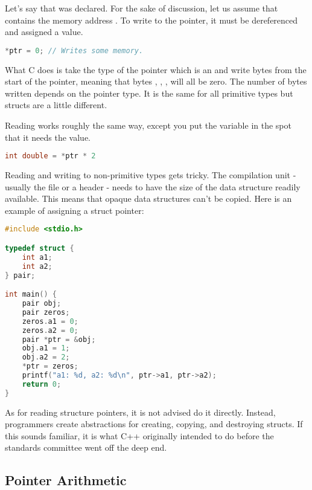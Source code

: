 Let's say that  was declared.
For the sake of discussion, let us assume that  contains the memory address .
To write to the pointer, it must be dereferenced and assigned a value.

\begin{lstlisting}[language=C]
*ptr = 0; // Writes some memory.
\end{lstlisting}

What C does is take the type of the pointer which is an  and write  bytes from the start of the pointer, meaning that bytes , , ,  will all be zero.
The number of bytes written depends on the pointer type.
It is the same for all primitive types but structs are a little different.

Reading works roughly the same way, except you put the variable in the spot that it needs the value.

\begin{lstlisting}[language=C]
int double = *ptr * 2
\end{lstlisting}

Reading and writing to non-primitive types gets tricky.
The compilation unit - usually the file or a header - needs to have the size of the data structure readily available.
This means that opaque data structures can't be copied.
Here is an example of assigning a struct pointer:

\begin{lstlisting}[language=C]
#include <stdio.h>

typedef struct {
    int a1;
    int a2;
} pair;

int main() {
    pair obj;
    pair zeros;
    zeros.a1 = 0;
    zeros.a2 = 0;
    pair *ptr = &obj;
    obj.a1 = 1;
    obj.a2 = 2;
    *ptr = zeros;
    printf("a1: %d, a2: %d\n", ptr->a1, ptr->a2);
    return 0;
}
\end{lstlisting}

As for reading structure pointers, it is not advised do it directly.
Instead, programmers create abstractions for creating, copying, and destroying structs.
If this sounds familiar, it is what C++ originally intended to do before the standards committee went off the deep end.

\subsection{Pointer Arithmetic}

